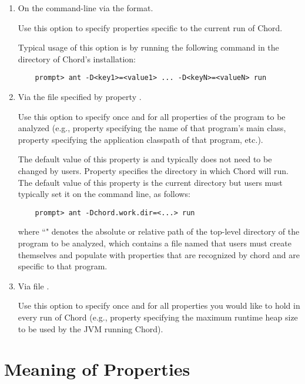 \begin{enumerate}
\item

On the command-line via the  format.

Use this option to specify properties specific to the current run of Chord.

Typical usage of this option is by running the following command in
the  directory of Chord's installation:
\begin{verbatim}
    prompt> ant -D<key1>=<value1> ... -D<keyN>=<valueN> run
\end{verbatim}

\item

Via the file specified by property .

Use this option to specify once and for all properties of the program to
be analyzed (e.g., property  specifying the name of that program's main class, property 
specifying the application classpath of that program, etc.).

The default value of this property is  and typically
does not need to be changed by users.
Property  specifies the directory in which Chord will run.
The default value of this property is the current directory but users must typically set
it on the command line, as follows:

\begin{verbatim}
    prompt> ant -Dchord.work.dir=<...> run
\end{verbatim}
where ``" denotes the absolute or relative path of the top-level directory of
the program to be analyzed, which contains a file named  that users
must create themselves and populate with properties that are recognized by chord and
are specific to that program.

\item

Via file .

Use this option to specify once and for all properties you would like to hold in every run of Chord
(e.g., property  specifying the maximum runtime heap size to be used by the
JVM running Chord).
\end{enumerate}

\section{Meaning of Properties}
\label{sec:properties-meaning}

